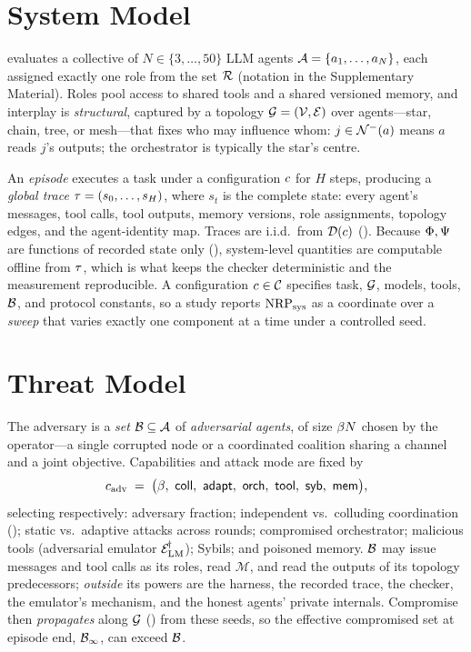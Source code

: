 \section{System Model}
\label{sec:system}

 evaluates a collective of $N\in\{3,\dots,50\}$ LLM agents
$\mathcal{A}=\{a_1,\dots,a_N\}$, each assigned exactly one role from the set $\mathcal{R}$
(notation in the Supplementary Material). Roles pool access to shared tools and a shared
versioned memory, and interplay is \emph{structural}, captured by a topology
$\mathcal{G}=(\mathcal{V},\mathcal{E})$ over agents---star, chain, tree, or mesh---that fixes who may
influence whom:
$j\in\mathcal{N}^{-}(a)$ means $a$ reads $j$'s outputs; the orchestrator is typically the star's
centre.

An \emph{episode} executes a task under a configuration $c$ for $H$ steps, producing
a \emph{global trace} $\tau=(s_0,\dots,s_H)$, where $s_t$ is the complete state: every
agent's messages, tool calls, tool outputs, memory versions, role assignments, topology
edges, and the agent-identity map. Traces are i.i.d.\ from $\mathcal{D}(c)$
(). Because $\Phi,\Psi$ are functions of recorded state only
(), system-level quantities are computable offline from $\tau$,
which is what keeps the checker deterministic and the measurement reproducible. A
configuration $c\in\mathcal{C}$ specifies task, $\mathcal{G}$, models, tools, $\mathcal{B}$, and
protocol constants, so a study reports $\mathrm{NRP}_{\mathrm{sys}}$ as a coordinate over a \emph{sweep} that
varies exactly one component at a time under a controlled seed.

\section{Threat Model}
\label{sec:threat}

The adversary is a \emph{set} $\mathcal{B}\subseteq\mathcal{A}$ of \emph{adversarial agents},
of size $\beta N$ chosen by the operator---a single corrupted node or a coordinated
coalition sharing a channel and a joint objective. Capabilities and attack mode are fixed
by
\begin{equation}
\label{eq:adv-config}
\config_{\mathrm{adv}}\;=\;\bigl(\betafrac,\ \mathsf{coll},\ \mathsf{adapt},\ \mathsf{orch},\ \mathsf{tool},\ \mathsf{syb},\ \mathsf{mem}\bigr),
\end{equation}
selecting respectively: adversary fraction; independent vs.\ colluding coordination
(); static vs.\ adaptive attacks across \corb{} rounds; compromised
orchestrator; malicious tools (adversarial emulator $\mathcal{E}_{\mathrm{LM}}^{\!\dagger}$); Sybils; and
poisoned memory. $\mathcal{B}$ may issue messages and tool calls as its roles, read
$\mathcal{M}$, and read the outputs of its topology predecessors; \emph{outside} its
powers are the harness, the recorded trace, the checker, the emulator's mechanism, and the
honest agents' private internals. Compromise then \emph{propagates} along $\mathcal{G}$
() from these seeds, so the effective compromised set at episode end,
$\mathcal{B}_\infty$, can exceed $\mathcal{B}$.

